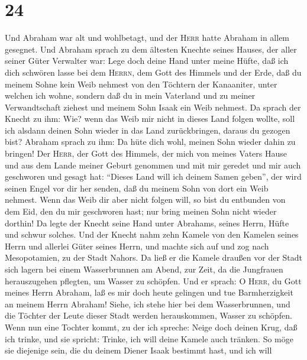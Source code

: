 \hypertarget{section-23}{%
\section{24}\label{section-23}}

 Und Abraham war alt und wohlbetagt, und der \textsc{Herr}
hatte Abraham in allem gesegnet.  Und Abraham sprach zu
dem ältesten Knechte seines Hauses, der aller seiner Güter Verwalter
war: Lege doch deine Hand unter meine Hüfte,  daß ich dich
schwören lasse bei dem \textsc{Herrn}, dem Gott des Himmels und der
Erde, daß du meinem Sohne kein Weib nehmest von den Töchtern der
Kanaaniter, unter welchen ich wohne,  sondern daß du in
mein Vaterland und zu meiner Verwandtschaft ziehest und meinem Sohn
Isaak ein Weib nehmest.  Da sprach der Knecht zu ihm: Wie?
wenn das Weib mir nicht in dieses Land folgen wollte, soll ich alsdann
deinen Sohn wieder in das Land zurückbringen, daraus du gezogen bist?
 Abraham sprach zu ihm: Da hüte dich wohl, meinen Sohn
wieder dahin zu bringen!  Der \textsc{Herr}, der Gott des
Himmels, der mich von meines Vaters Hause und aus dem Lande meiner
Geburt genommen und mit mir geredet und mir auch geschworen und gesagt
hat: ``Dieses Land will ich deinem Samen geben'', der wird seinen Engel
vor dir her senden, daß du meinem Sohn von dort ein Weib nehmest.
 Wenn das Weib dir aber nicht folgen will, so bist du
entbunden von dem Eid, den du mir geschworen hast; nur bring meinen Sohn
nicht wieder dorthin!  Da legte der Knecht seine Hand
unter Abrahams, seines Herrn, Hüfte und schwur solches. 
Und der Knecht nahm zehn Kamele von den Kamelen seines Herrn und
allerlei Güter seines Herrn, und machte sich auf und zog nach
Mesopotamien, zu der Stadt Nahors.  Da ließ er die Kamele
draußen vor der Stadt sich lagern bei einem Wasserbrunnen am Abend, zur
Zeit, da die Jungfrauen herauszugehen pflegten, um Wasser zu schöpfen.
 Und er sprach: O \textsc{Herr}, du Gott meines Herrn
Abraham, laß es mir doch heute gelingen und tue Barmherzigkeit an meinem
Herrn Abraham!  Siehe, ich stehe hier bei dem
Wasserbrunnen, und die Töchter der Leute dieser Stadt werden
herauskommen, Wasser zu schöpfen.  Wenn nun eine Tochter
kommt, zu der ich spreche: Neige doch deinen Krug, daß ich trinke, und
sie spricht: Trinke, ich will deine Kamele auch tränken. So möge sie
diejenige sein, die du deinem Diener Isaak bestimmt hast, und ich will
